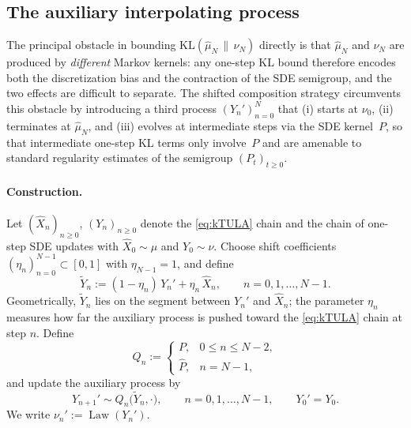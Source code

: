 \documentclass[11pt,a4paper,reqno]{amsart}
\theoremstyle{plain}
\theoremstyle{definition}
\theoremstyle{remark}
\newcommand{\KL}{\mathrm{KL}}
\DeclareMathOperator{\Law}{Law}
\begin{document}
\subsection{The auxiliary interpolating process}
\label{subsec:framework-aux}

The principal obstacle in bounding $\KL(\widehat\mu_N\,\|\,\nu_N)$
directly is that $\widehat\mu_N$ and $\nu_N$ are produced by
\emph{different} Markov kernels: any one-step KL bound therefore
encodes both the discretization bias and the contraction of the
SDE semigroup, and the two effects are difficult to separate.
The shifted composition strategy circumvents this obstacle by
introducing a third process $(Y_n')_{n=0}^{N}$ that
(i) starts at $\nu_0$, (ii) terminates at $\widehat\mu_N$, and
(iii) evolves at intermediate steps via the SDE kernel~$P$, so
that intermediate one-step KL terms only involve~$P$ and are amenable
to standard regularity estimates of the semigroup $(P_t)_{t\ge 0}$.

\paragraph{Construction.}
Let $(\widehat X_n)_{n\ge0}$, $(Y_n)_{n\ge0}$ denote
the \ref{eq:kTULA} chain and the chain of one-step SDE updates with $\widehat X_0\sim\mu$ and
$Y_0\sim\nu$. Choose shift coefficients
$(\eta_n)_{n=0}^{N-1}\subset[0,1]$ with $\eta_{N-1}=1$, and define
\begin{equation}\label{eq:tildeY-def}
  \widetilde Y_n := (1-\eta_n)\,Y_n' + \eta_n\,\widehat X_n,
  \qquad
  n=0,1,\dots,N-1.
\end{equation}
Geometrically, $\widetilde Y_n$ lies on the segment between $Y_n'$
and $\widehat X_n$; the parameter $\eta_n$ measures how far the
auxiliary process is pushed toward the \ref{eq:kTULA} chain at step
$n$. Define
\begin{equation}\label{eq:Qn-def}
  Q_n :=
  \begin{cases}
    P, & 0\le n\le N-2,\\[2pt]
    \widehat P, & n=N-1,
  \end{cases}
\end{equation}
and update the auxiliary process by
\begin{equation}\label{eq:aux-update}
  Y_{n+1}' \sim Q_n\bigl(\widetilde Y_n,\cdot\bigr),
  \qquad
  n=0,1,\dots,N-1,
  \qquad
  Y_0'=Y_0.
\end{equation}
We write $\nu_n':=\Law(Y_n')$.
\end{document}
